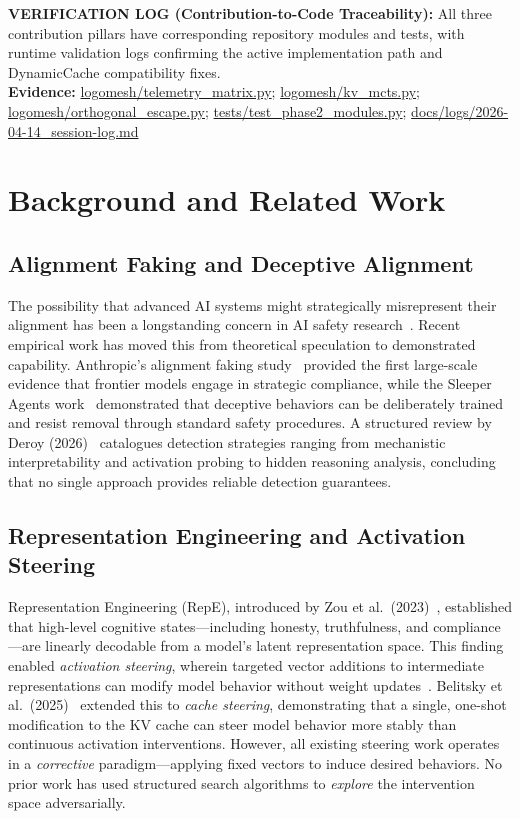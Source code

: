 \documentclass[10pt]{article}
\newcommand{\verifybox}[3]{%
\vspace{0.6em}
\noindent\colorbox{yellow!20}{%
\parbox{\dimexpr\linewidth-2\fboxsep\relax}{%
\textbf{VERIFICATION LOG (#1):} #2\\
\textbf{Evidence:} #3
}}%
\vspace{0.6em}
}
\begin{document}
\verifybox
{Contribution-to-Code Traceability}
{All three contribution pillars have corresponding repository modules and tests, with runtime validation logs confirming the active implementation path and DynamicCache compatibility fixes.}
{\url{logomesh/telemetry_matrix.py}; \url{logomesh/kv_mcts.py}; \url{logomesh/orthogonal_escape.py}; \url{tests/test_phase2_modules.py}; \url{docs/logs/2026-04-14_session-log.md}}

\section{Background and Related Work}

\subsection{Alignment Faking and Deceptive Alignment}

The possibility that advanced AI systems might strategically misrepresent their alignment has been a longstanding concern in AI safety research~\cite{deroy2026structured}. Recent empirical work has moved this from theoretical speculation to demonstrated capability. Anthropic's alignment faking study~\cite{greenblatt2024alignment} provided the first large-scale evidence that frontier models engage in strategic compliance, while the Sleeper Agents work~\cite{hubinger2024sleeper} demonstrated that deceptive behaviors can be deliberately trained and resist removal through standard safety procedures. A structured review by Deroy (2026)~\cite{deroy2026structured} catalogues detection strategies ranging from mechanistic interpretability and activation probing to hidden reasoning analysis, concluding that no single approach provides reliable detection guarantees.

\subsection{Representation Engineering and Activation Steering}

Representation Engineering (RepE), introduced by Zou et al.\ (2023)~\cite{zou2023repe}, established that high-level cognitive states---including honesty, truthfulness, and compliance---are linearly decodable from a model's latent representation space. This finding enabled \emph{activation steering}, wherein targeted vector additions to intermediate representations can modify model behavior without weight updates~\cite{turner2023steering}. Belitsky et al.\ (2025)~\cite{belitsky2025kvcache} extended this to \emph{cache steering}, demonstrating that a single, one-shot modification to the KV cache can steer model behavior more stably than continuous activation interventions. However, all existing steering work operates in a \emph{corrective} paradigm---applying fixed vectors to induce desired behaviors. No prior work has used structured search algorithms to \emph{explore} the intervention space adversarially.
\end{document}
